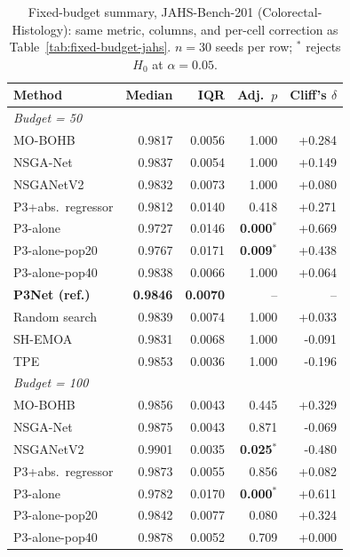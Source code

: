 \begin{table}[t]
    \centering
    \footnotesize
    \caption{Fixed-budget summary, JAHS-Bench-201 (Colorectal-Histology): same metric, columns, and
    per-cell correction as Table~\ref{tab:fixed-budget-jahs}. $n=30$ seeds per row; $^{*}$ rejects $H_0$
    at $\alpha=0.05$.}
    \label{tab:fixed-budget-colorectal}
    \begin{tabular}{@{}lrrrr@{}}
        \toprule
        \textbf{Method} & \textbf{Median} & \textbf{IQR} & \textbf{Adj.\ $p$} & \textbf{Cliff's $\delta$} \\
        \midrule
        \multicolumn{5}{l}{\emph{Budget = 50}} \\
        MO-BOHB & 0.9817 & 0.0056 & 1.000 & +0.284 \\
        NSGA-Net & 0.9837 & 0.0054 & 1.000 & +0.149 \\
        NSGANetV2 & 0.9832 & 0.0073 & 1.000 & +0.080 \\
        P3+abs.\ regressor & 0.9812 & 0.0140 & 0.418 & +0.271 \\
        P3-alone & 0.9727 & 0.0146 & \textbf{0.000$^{*}$} & +0.669 \\
        P3-alone-pop20 & 0.9767 & 0.0171 & \textbf{0.009$^{*}$} & +0.438 \\
        P3-alone-pop40 & 0.9838 & 0.0066 & 1.000 & +0.064 \\
        \textbf{P3Net (ref.)} & \textbf{0.9846} & \textbf{0.0070} & -- & -- \\
        Random search & 0.9839 & 0.0074 & 1.000 & +0.033 \\
        SH-EMOA & 0.9831 & 0.0068 & 1.000 & -0.091 \\
        TPE & 0.9853 & 0.0036 & 1.000 & -0.196 \\
        \midrule
        \multicolumn{5}{l}{\emph{Budget = 100}} \\
        MO-BOHB & 0.9856 & 0.0043 & 0.445 & +0.329 \\
        NSGA-Net & 0.9875 & 0.0043 & 0.871 & -0.069 \\
        NSGANetV2 & 0.9901 & 0.0035 & \textbf{0.025$^{*}$} & -0.480 \\
        P3+abs.\ regressor & 0.9873 & 0.0055 & 0.856 & +0.082 \\
        P3-alone & 0.9782 & 0.0170 & \textbf{0.000$^{*}$} & +0.611 \\
        P3-alone-pop20 & 0.9842 & 0.0077 & 0.080 & +0.324 \\
        P3-alone-pop40 & 0.9878 & 0.0052 & 0.709 & +0.000 \\

\end{tabular}
\end{table}
